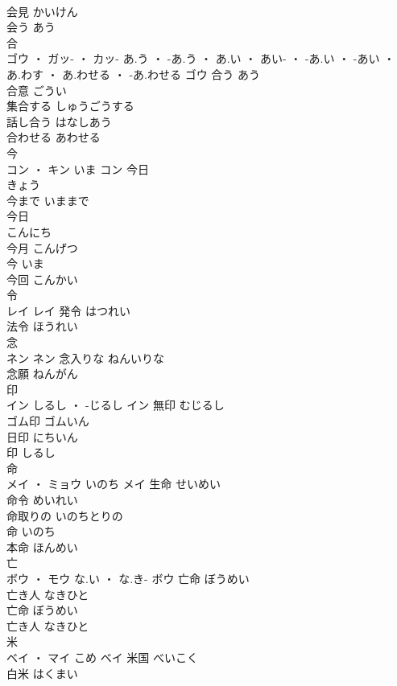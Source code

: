 \documentclass[8pt]{extreport}
\begin{document}
\begin{CJK}{UTF8}{min}
\\	会見	かいけん	
\\	会う	あう	
\\	合	
\\	ゴウ ・ ガッ- ・ カッ-	あ.う ・ -あ.う ・ あ.い ・ あい- ・ -あ.い ・ -あい ・ あ.わす ・ あ.わせる ・ -あ.わせる	ゴウ	合う	あう	
\\	合意	ごうい	
\\	集合する	しゅうごうする	
\\	話し合う	はなしあう	
\\	合わせる	あわせる	
\\	今	
\\	コン ・ キン	いま	コン	今日 
\\	きょう	
\\	今まで	いままで	
\\	今日 
\\	こんにち	
\\	今月	こんげつ	
\\	今	いま	
\\	今回	こんかい	
\\	令	
\\	レイ		レイ	発令	はつれい	
\\	法令	ほうれい	
\\	念	
\\	ネン		ネン	念入りな	ねんいりな	
\\	念願	ねんがん	
\\	印	
\\	イン	しるし ・ -じるし	イン	無印	むじるし	
\\	ゴム印	ゴムいん	
\\	日印	にちいん	
\\	印	しるし	
\\	命	
\\	メイ ・ ミョウ	いのち	メイ	生命	せいめい	
\\	命令	めいれい	
\\	命取りの	いのちとりの	
\\	命	いのち	
\\	本命	ほんめい	
\\	亡	
\\	ボウ ・ モウ	な.い ・ な.き-	ボウ	亡命	ぼうめい	
\\	亡き人	なきひと	
\\	亡命	ぼうめい	
\\	亡き人	なきひと	
\\	米	
\\	ベイ ・ マイ	こめ	ベイ	米国	べいこく	
\\	白米	はくまい	

\end{CJK}
\end{document}
